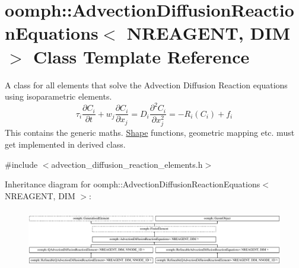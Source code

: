 \hypertarget{classoomph_1_1AdvectionDiffusionReactionEquations}{}\section{oomph\+:\+:Advection\+Diffusion\+Reaction\+Equations$<$ N\+R\+E\+A\+G\+E\+NT, D\+IM $>$ Class Template Reference}
\label{classoomph_1_1AdvectionDiffusionReactionEquations}


A class for all elements that solve the Advection Diffusion Reaction equations using isoparametric elements. \[ \tau_{i} \frac{\partial C_{i}}{\partial t} + w_{j} \frac{\partial C_{i}}{\partial x_{j}} = D_{i}\frac{\partial^2 C_{i}}{\partial x_j^2} = - R_{i}(C_{i}) + f_{i} \] This contains the generic maths. \hyperlink{classoomph_1_1Shape}{Shape} functions, geometric mapping etc. must get implemented in derived class.  




{\ttfamily \#include $<$advection\+\_\+diffusion\+\_\+reaction\+\_\+elements.\+h$>$}

Inheritance diagram for oomph\+:\+:Advection\+Diffusion\+Reaction\+Equations$<$ N\+R\+E\+A\+G\+E\+NT, D\+IM $>$\+:\begin{figure}[H]
\begin{center}
\leavevmode
\includegraphics[height=2.626642cm]{classoomph_1_1AdvectionDiffusionReactionEquations}
\end{center}
\end{figure}
